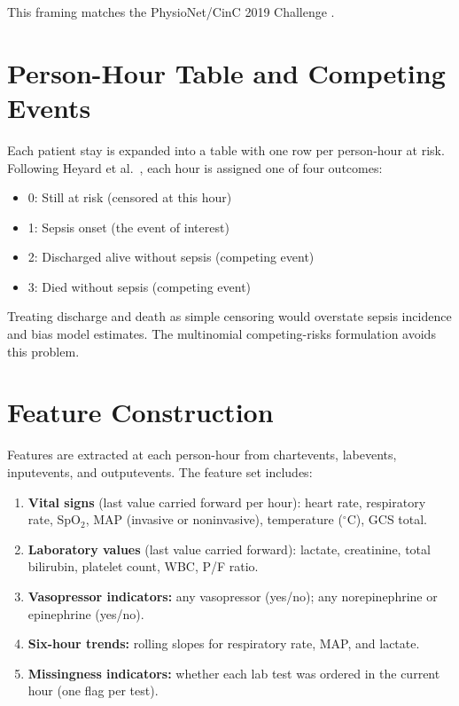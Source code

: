 This framing matches the PhysioNet/CinC 2019 Challenge
\cite{reyna2020utility}.


\section{Person-Hour Table and Competing Events}
\label{sec:person_hours}

Each patient stay is expanded into a table with one row per person-hour at
risk. Following Heyard et al.\ \cite{heyard2019dynamic}, each hour is
assigned one of four outcomes:

\begin{itemize}
    \item 0: Still at risk (censored at this hour)
    \item 1: Sepsis onset (the event of interest)
    \item 2: Discharged alive without sepsis (competing event)
    \item 3: Died without sepsis (competing event)
\end{itemize}

Treating discharge and death as simple censoring would overstate sepsis
incidence and bias model estimates. The multinomial competing-risks formulation
avoids this problem.


\section{Feature Construction}
\label{sec:features}

Features are extracted at each person-hour from chartevents, labevents,
inputevents, and outputevents. The feature set includes:

\begin{enumerate}
    \item \textbf{Vital signs} (last value carried forward per hour): heart rate,
    respiratory rate, SpO$_2$, MAP (invasive or noninvasive), temperature
    ($^\circ$C), GCS total.
    \item \textbf{Laboratory values} (last value carried forward): lactate,
    creatinine, total bilirubin, platelet count, WBC, P/F ratio.
    \item \textbf{Vasopressor indicators:} any vasopressor (yes/no); any
    norepinephrine or epinephrine (yes/no).
    \item \textbf{Six-hour trends:} rolling slopes for respiratory rate, MAP,
    and lactate.
    \item \textbf{Missingness indicators:} whether each lab test was ordered in
    the current hour (one flag per test).
\end{enumerate}

